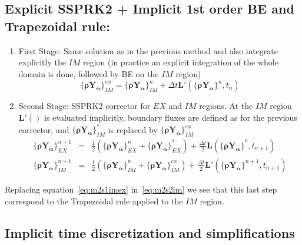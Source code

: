 \subsection*{Explicit SSPRK2 + Implicit 1st order BE and Trapezoidal rule:}
%
\begin{enumerate}
   \item First Stage: Same solution as in the previous method and also integrate explicitly the $IM$ region (in practice an explicit integration of the whole domain is done, followed by BE on the $IM$ region)
   \begin{equation}
     \{\mathbf{\rho Y_\alpha}\}^{ex}_{IM} = \{\mathbf{\rho Y_\alpha}\}^{n}_{IM}+\Delta t \mathbf{L}'(\{\mathbf{\rho Y_\alpha}\}^n,t_n) \label{eq:m2s1imex}
   \end{equation}

  \item Second Stage: SSPRK2 corrector for $EX$ and $IM$ regions. At the $IM$ region $\mathbf{L}'()$ is evaluated implicitly, boundary fluxes are defined as for the previous corrector, and $\{\mathbf{\rho Y_\alpha}\}^{*}_{IM}$ is replaced by $\{\mathbf{\rho Y_\alpha}\}^{ex}_{IM}$
   \begin{eqnarray}
   \{\mathbf{\rho Y_\alpha}\}^{n+1}_{EX}&=& \frac{1}{2}\left( \{\mathbf{\rho Y_\alpha}\}^{n}_{EX} +
                                                                                              \{\mathbf{\rho Y_\alpha}\}^*_{EX} \right) +
                                                   \frac{\Delta t}{2} \mathbf{L}(\{\mathbf{\rho Y_\alpha}\}^*,t_{n+1})  \label{eq:m2s2ex} \\
   \{\mathbf{\rho Y_\alpha}\}^{n+1}_{IM}&=& \frac{1}{2}\left( \{\mathbf{\rho Y_\alpha}\}^{n}_{IM} +
                                                                                             \{\mathbf{\rho Y_\alpha}\}^{ex}_{IM} \right) +
                                                   \frac{\Delta t}{2} \mathbf{L}'(\{\mathbf{\rho Y_\alpha}\}^{n+1},t_{n+1}) \label{eq:m2s2im}
   \end{eqnarray}
\end{enumerate}
%
Replacing equation~\eqref{eq:m2s1imex} in~\eqref{eq:m2s2im} we see that this last step correspond to the Trapezoidal rule applied to the $IM$ region.


\subsection{Implicit time discretization and simplifications}

